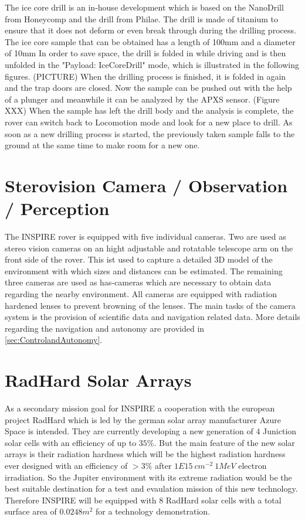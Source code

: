 The ice core drill is an in-house development which is based on the NanoDrill from Honeycomp and the drill from Philae. The drill is made of titanium to ensure that it does not deform or even break through during the drilling process.
The ice core sample that can be obtained has a length of 100mm and a diameter of 10mm
In order to save space, the drill is folded in while driving and is then unfolded in the "Payload: IceCoreDrill" mode, which is illustrated in the following figures. (PICTURE)
When the drilling process is finished, it is folded in again and the trap doors are closed.
Now the sample can be pushed out with the help of a plunger and meanwhile it can be analyzed by the APXS sensor. (Figure XXX)
When the sample has left the drill body and the analysis is complete, the rover can switch back to Locomotion mode and look for a new place to drill. As soon as a new drilling process is started, the previously taken sample falls to the ground at the same time to make room for a new one.

\section{Sterovision Camera / Observation / Perception}

The INSPIRE rover is equipped with five individual cameras. Two are used as stereo vision cameras on an hight adjustable and rotatable telescope arm on the front side of the rover. This ist used to capture a detailed 3D model of the environment with which sizes and distances can be estimated. The remaining three cameras are used as has-cameras which are necessary to obtain data regarding the nearby environment. All cameras are equipped with radiation hardened lenses to prevent browning of the lenses. The main tasks of the camera system is the provision of scientific data and navigation related data. More details regarding the navigation and autonomy are provided in \autoref{sec:ControlandAutonomy}.

\section{RadHard Solar Arrays}
\label{subsec:radhard}
As a secondary mission goal for INSPIRE a cooperation with the european project RadHard which is led by the german solar array manufacturer Azure Space is intended. They are currently developing a new generation of $4$ Juniction solar cells with an efficiency of up to $35 \% $. But the main feature of the new solar arrays is their radiation hardness which will be the highest radiation hardness ever designed with an efficiency of $>3 \% $ after $1E15 \ cm^{-2} \ 1MeV$ electron irradiation. So the Jupiter environment with its extreme radiation would be the best suitable destination for a test and evaulation mission of this new technology. Therefore INSPIRE will be equipped with $8$ RadHard solar cells with a total surface area of $0.0248 m^2$ for a technology demonstration\cite{FraunhoferInstituteforSolarEnergySystemsISE.2021}.

